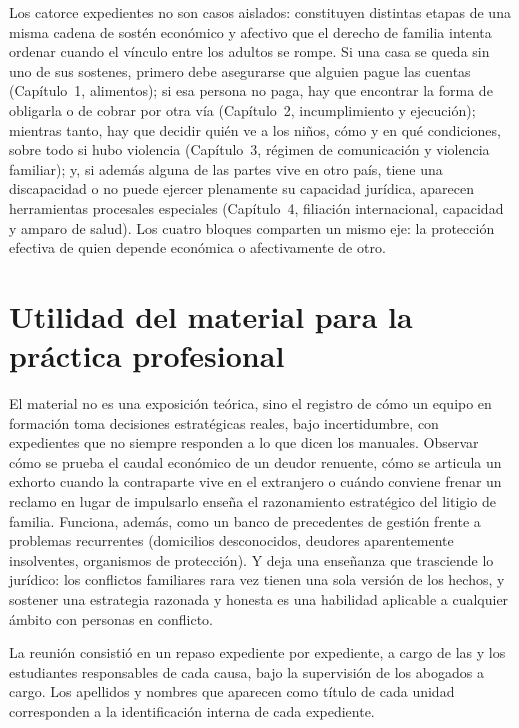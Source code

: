 \documentclass[12pt,oneside]{book}
\begin{document}
Los catorce expedientes no son casos aislados: constituyen distintas etapas de una misma cadena de sostén económico y afectivo que el derecho de familia intenta ordenar cuando el vínculo entre los adultos se rompe. Si una casa se queda sin uno de sus sostenes, primero debe asegurarse que alguien pague las cuentas (Capítulo~1, alimentos); si esa persona no paga, hay que encontrar la forma de obligarla o de cobrar por otra vía (Capítulo~2, incumplimiento y ejecución); mientras tanto, hay que decidir quién ve a los niños, cómo y en qué condiciones, sobre todo si hubo violencia (Capítulo~3, régimen de comunicación y violencia familiar); y, si además alguna de las partes vive en otro país, tiene una discapacidad o no puede ejercer plenamente su capacidad jurídica, aparecen herramientas procesales especiales (Capítulo~4, filiación internacional, capacidad y amparo de salud). Los cuatro bloques comparten un mismo eje: la protección efectiva de quien depende económica o afectivamente de otro.

\section*{Utilidad del material para la práctica profesional}

El material no es una exposición teórica, sino el registro de cómo un equipo en formación toma decisiones estratégicas reales, bajo incertidumbre, con expedientes que no siempre responden a lo que dicen los manuales. Observar cómo se prueba el caudal económico de un deudor renuente, cómo se articula un exhorto cuando la contraparte vive en el extranjero o cuándo conviene frenar un reclamo en lugar de impulsarlo enseña el razonamiento estratégico del litigio de familia. Funciona, además, como un banco de precedentes de gestión frente a problemas recurrentes (domicilios desconocidos, deudores aparentemente insolventes, organismos de protección). Y deja una enseñanza que trasciende lo jurídico: los conflictos familiares rara vez tienen una sola versión de los hechos, y sostener una estrategia razonada y honesta es una habilidad aplicable a cualquier ámbito con personas en conflicto.

\begin{note}
La reunión consistió en un repaso expediente por expediente, a cargo de las y los estudiantes responsables de cada causa, bajo la supervisión de los abogados a cargo. Los apellidos y nombres que aparecen como título de cada unidad corresponden a la identificación interna de cada expediente.
\end{note}
\end{document}
